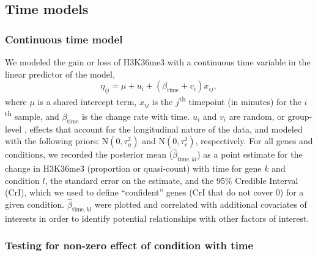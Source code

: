 \documentclass[11pt]{biorxiv}
\begin{document}
\subsection{Time models}

\subsubsection{Continuous time model}

We modeled the gain or loss of H3K36me3 with a continuous time variable in the linear predictor of the model, 
\begin{equation}
	\eta_{ij} = \mu + u_{i} + (\beta_{\text{time}} + v_{i})x_{ij},
\end{equation}
where $\mu$ is a shared intercept term, $x_{ij}$ is the $j$\textsuperscript{th} timepoint (in minutes) for the $i$\textsuperscript{th} sample, and $\beta_{\text{time}}$ is the change rate with time. $u_{i}$ and $v_{i}$ are random, or group-level \citep{Gelman2006}, effects that account for the longitudinal nature of the data, and modeled with the following priors: $\text{N}(0, \tau^{2}_{u})$ and $\text{N}(0, \tau^{2}_{v})$, respectively. For all genes and conditions, we recorded the posterior mean ($\widehat{\beta}_{\text{time}, kl}$) as a point estimate for the change in H3K36me3 (proportion or quasi-count) with time for gene $k$ and condition $l$, the standard error on the estimate, and the 95\% Credible Interval (CrI), which we used to define ``confident'' genes (CrI that do not cover 0) for a given condition. $\widehat{\beta}_{\text{time}, kl}$ were plotted and correlated with additional covariates of interests in order to identify potential relationships with other factors of interest.

\subsubsection{Testing for non-zero effect of condition with time}
\end{document}

